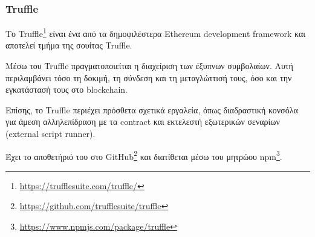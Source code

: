 \subsubsection{Truffle} \label{subsection:4-2-3-1-truffle}


Το Truffle\footnote{\url{https://trufflesuite.com/truffle/}} είναι ένα από τα δημοφιλέστερα Ethereum development framework και αποτελεί τμήμα της σουίτας Truffle.

Μέσω του Truffle πραγματοποιείται η διαχείριση των έξυπνων συμβολαίων. Αυτή περιλαμβάνει τόσο τη δοκιμή, τη σύνδεση και τη μεταγλώττισή τους, όσο και την εγκατάστασή τους στο blockchain.

Επίσης, το Truffle περιέχει πρόσθετα σχετικά εργαλεία, όπως διαδραστική κονσόλα για άμεση αλληλεπίδραση με τα contract και εκτελεστή εξωτερικών σεναρίων (external script runner). 

Έχει το αποθετήριό του στο GitHub\footnote{\url{https://github.com/trufflesuite/truffle}} και διατίθεται μέσω του μητρώου npm\footnote{\url{https://www.npmjs.com/package/truffle}}.